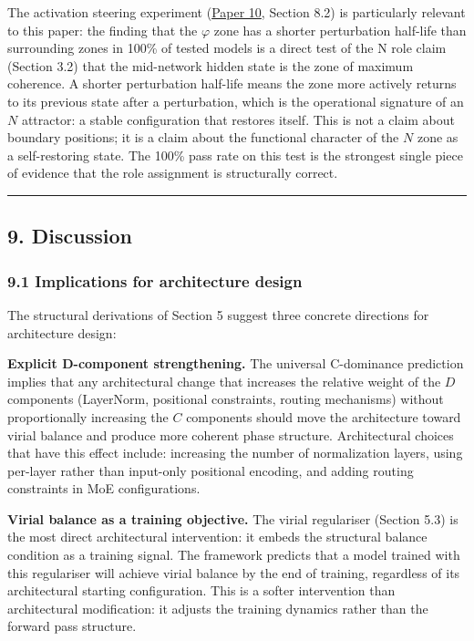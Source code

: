 \documentclass[
  11pt,
  letterpaper,
]{article}
\begin{document}
The activation steering experiment
(\href{https://github.com/baardev/truevalue/blob/main/docnav/Research/papers/10_tholonic-neural-architecture/10_tholonic-neural-architecture.pdf}{Paper
10}, Section 8.2) is particularly relevant to this paper: the finding
that the \(\varphi\) zone has a shorter perturbation half-life than
surrounding zones in 100\% of tested models is a direct test of the N
role claim (Section 3.2) that the mid-network hidden state is the zone
of maximum coherence. A shorter perturbation half-life means the zone
more actively returns to its previous state after a perturbation, which
is the operational signature of an \(N\) attractor: a stable
configuration that restores itself. This is not a claim about boundary
positions; it is a claim about the functional character of the \(N\)
zone as a self-restoring state. The 100\% pass rate on this test is the
strongest single piece of evidence that the role assignment is
structurally correct.

\begin{center}\rule{0.5\linewidth}{0.5pt}\end{center}

\subsection{9. Discussion}\label{discussion}

\subsubsection{9.1 Implications for architecture
design}\label{implications-for-architecture-design}

The structural derivations of Section 5 suggest three concrete
directions for architecture design:

\textbf{Explicit D-component strengthening.} The universal C-dominance
prediction implies that any architectural change that increases the
relative weight of the \(D\) components (LayerNorm, positional
constraints, routing mechanisms) without proportionally increasing the
\(C\) components should move the architecture toward virial balance and
produce more coherent phase structure. Architectural choices that have
this effect include: increasing the number of normalization layers,
using per-layer rather than input-only positional encoding, and adding
routing constraints in MoE configurations.

\textbf{Virial balance as a training objective.} The virial regulariser
(Section 5.3) is the most direct architectural intervention: it embeds
the structural balance condition as a training signal. The framework
predicts that a model trained with this regulariser will achieve virial
balance by the end of training, regardless of its architectural starting
configuration. This is a softer intervention than architectural
modification: it adjusts the training dynamics rather than the forward
pass structure.
\end{document}
